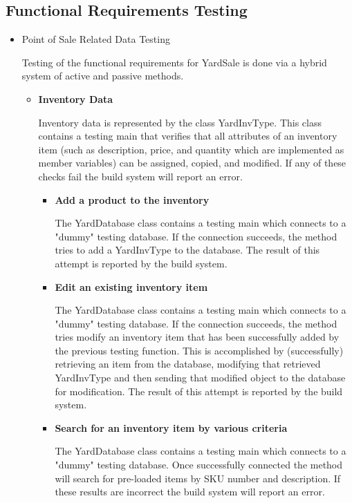 \documentclass{report}
\begin{document}
	\subsection{Functional Requirements Testing}
	\begin{itemize}
            \item {Point of Sale Related Data Testing}

	    Testing of the functional requirements for YardSale is done via a hybrid system of active and
	    passive methods.

	\begin{itemize}
                \item {\textbf{Inventory Data}}

		Inventory data is represented by the class YardInvType.  This class contains a testing main that
		verifies that all attributes of an inventory item (such as description, price, and quantity which are
		implemented as member variables) can be assigned, copied, and modified.  If any of these checks
		fail the build system will report an error.

                \begin{itemize}
                    \item {\textbf{Add a product to the inventory}}

		    The YardDatabase class contains a testing main which connects to a "dummy" testing database.
		    If the connection succeeds, the method tries to add a YardInvType to the database.  The result of this
		    attempt is reported by the build system.

                    \item {\textbf{Edit an existing inventory item}}

		    The YardDatabase class contains a testing main which connects to a "dummy" testing database.
		    If the connection succeeds, the method tries modify an inventory item that has been successfully
		    added by the previous testing function.  This is accomplished by (successfully) retrieving an item from the
		    database, modifying that retrieved YardInvType and then sending that modified object to the database
		    for modification.  The result of this attempt is reported by the build system.

                    \item {\textbf{Search for an inventory item by various criteria}}

		    The YardDatabase class contains a testing main which connects to a "dummy" testing database.
		    Once successfully connected the method will search for pre-loaded items by SKU number and description.
		    If these results are incorrect the build system will report an error.


\end{itemize}
\end{itemize}
\end{itemize}
\end{document}
